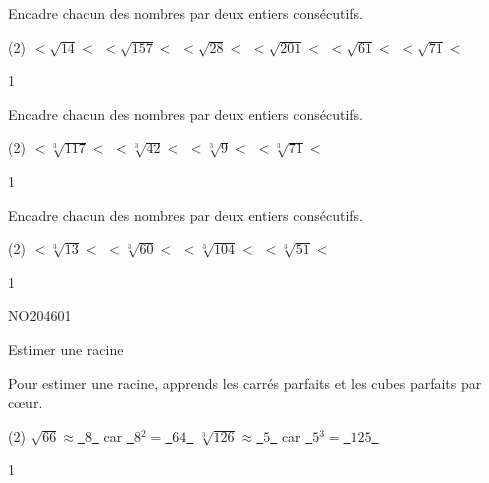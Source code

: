 \documentclass[a4paper,11pt]{report}
\begin{document}
\newpage

\begin{exop}{
    Encadre chacun des nombres par deux entiers consécutifs.
    \begin{tasks}(2)
    \task \hrulefill $< \sqrt{14} <$ \hrulefill
    \task \hrulefill $< \sqrt{157} <$ \hrulefill
    \task \hrulefill $< \sqrt{28} <$ \hrulefill
    \task \hrulefill $< \sqrt{201} <$ \hrulefill
    \task \hrulefill $< \sqrt{61} <$ \hrulefill
    \task \hrulefill $< \sqrt{71} <$ \hrulefill
    \end{tasks}
}{1}    
\end{exop}


\begin{exop}{
    Encadre chacun des nombres par deux entiers consécutifs.
    \begin{tasks}(2)
    \task \hrulefill $< \sqrt[3]{117} <$ \hrulefill
    \task \hrulefill $< \sqrt[3]{42} <$ \hrulefill
    \task \hrulefill $< \sqrt[3]{9} <$ \hrulefill
    \task \hrulefill $< \sqrt[3]{71} <$ \hrulefill
    \end{tasks}
}{1}    
\end{exop}

\begin{exop}{
    Encadre chacun des nombres par deux entiers consécutifs.
    \begin{tasks}(2)
    \task \hrulefill $< \sqrt[3]{13} <$ \hrulefill
    \task \hrulefill $< \sqrt[3]{60} <$ \hrulefill
    \task \hrulefill $< \sqrt[3]{104} <$ \hrulefill
    \task \hrulefill $< \sqrt[3]{51} <$ \hrulefill
    \end{tasks}
}{1}    
\end{exop}




\begin{exof}{NO204}{60}{1} %
\end{exof}




\newpage
\begin{resolu}{Estimer une racine}{
Pour estimer une racine, apprends les carrés parfaits et les cubes parfaits par cœur.
\begin{tasks}(2)
    \task $\sqrt{66}\approx$\underline{~$8$~} car \underline{~$8$}$^2=$\underline{~$64$~}
    \task $\sqrt[3]{126}\approx$\underline{~$5$~} car \underline{~$5$}$^3=$\underline{~$125$~}
\end{tasks}
}{1}    
\end{resolu}
\end{document}
